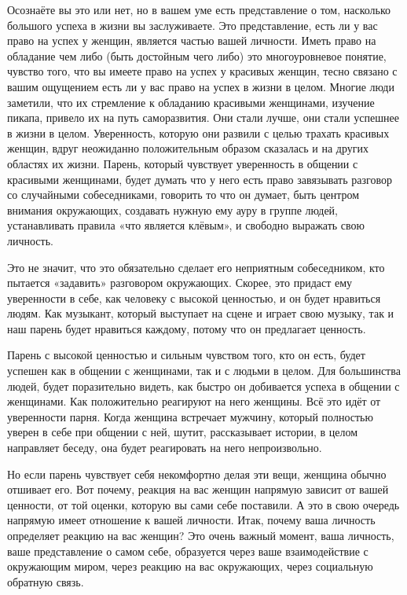 Осознаёте вы это или нет, но в вашем уме есть представление о том, насколько большого успеха в жизни вы заслуживаете. Это представление, есть ли у вас право на успех у женщин, является частью вашей личности. Иметь право на обладание чем либо (быть достойным чего либо) это многоуровневое понятие, чувство того, что вы имеете право на успех у красивых женщин, тесно связано с вашим ощущением есть ли у вас право на успех в жизни в целом. Многие люди заметили, что их стремление к обладанию красивыми женщинами, изучение пикапа, привело их на путь саморазвития. Они стали лучше, они стали успешнее в жизни в целом. Уверенность, которую они развили с целью трахать красивых женщин, вдруг неожиданно положительным образом сказалась и на других областях их жизни. Парень, который чувствует уверенность в общении с красивыми женщинами, будет думать что у него есть право завязывать разговор со случайными собеседниками, говорить то что он думает, быть центром внимания окружающих, создавать нужную ему ауру в группе людей, устанавливать правила «что является клёвым», и свободно выражать свою личность.

Это не значит, что это обязательно сделает его неприятным собеседником, кто пытается «задавить» разговором окружающих. Скорее, это придаст ему уверенности в себе, как человеку с высокой ценностью, и он будет нравиться людям. Как музыкант, который выступает на сцене и играет свою музыку, так и наш парень будет нравиться каждому, потому что он предлагает ценность.

\RULE  Парень с высокой ценностью и сильным чувством того, кто он есть, будет успешен как в общении с женщинами, так и с людьми в целом. Для большинства людей, будет поразительно видеть, как быстро он добивается успеха в общении с женщинами. Как положительно реагируют на него женщины. Всё это идёт от уверенности парня. Когда женщина встречает мужчину, который полностью уверен в себе при общении с ней, шутит, рассказывает истории, в целом направляет беседу, она будет реагировать на него непроизвольно.

Но если парень чувствует себя некомфортно делая эти вещи, женщина обычно отшивает его. Вот почему, реакция на вас женщин напрямую зависит от вашей ценности, от той оценки, которую вы сами себе поставили. А это в свою очередь напрямую имеет отношение к вашей личности. Итак, почему ваша личность определяет реакцию на вас женщин? Это очень важный момент, ваша личность, ваше представление о самом себе, образуется через ваше взаимодействие с окружающим миром, через реакцию на вас окружающих, через социальную обратную связь.

